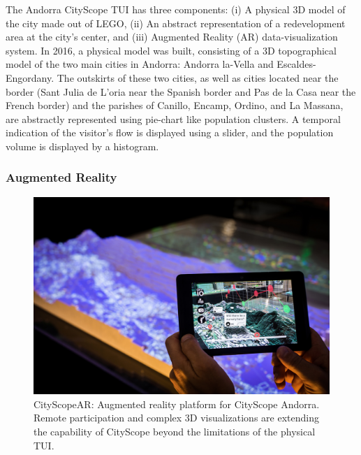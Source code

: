 {{{            The Andorra CityScope TUI has three components: (i) A physical 3D model of the city made out of LEGO, (ii) An abstract representation of a redevelopment area at the city's center, and (iii) Augmented Reality (AR) data-visualization system.
            \newline
            In 2016, a physical model was built, consisting of a 3D topographical model of the two main cities in Andorra: Andorra la-Vella and Escaldes-Engordany. The outskirts of these two cities, as well as cities located near the border (Sant Julia de L'oria near the Spanish border and Pas de la Casa near the French border) and the parishes of Canillo, Encamp, Ordino, and La Massana, are abstractly represented using pie-chart like population clusters. A temporal indication of the visitor's flow is displayed using a slider, and the population volume is displayed by a histogram.
        }

        \subsubsection{Augmented Reality}
        {
            \begin{figure}[h]
                \begin{center}
                    \includegraphics[width=1\textwidth]{chapters/insight/and_abm/figures/and_ar.jpg}
                \end{center}
                \caption{CityScopeAR: Augmented reality platform for CityScope Andorra. Remote participation and complex 3D visualizations are extending the capability of CityScope beyond the limitations of the physical TUI.}
                \label{fig:and_AR}
            \end{figure}

}}}
